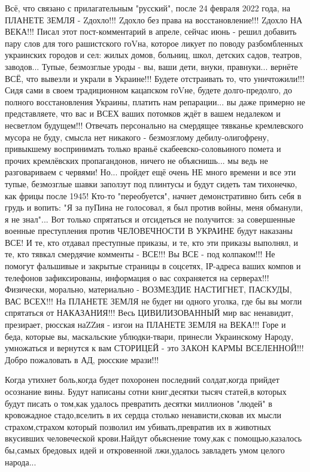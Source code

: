 Всё, что связано с прилагательным "русский", после 24 февраля 2022 года, на ПЛАНЕТЕ ЗЕМЛЯ - Zдохло!!! Zдохло без права на восстановление!!! Zдохло НА ВЕКА!!!
Писал этот пост-комментарий в апреле, сейчас июнь - решил добавить пару слов для того рашистского гоVна, которое ликует по поводу разбомбленных украинских городов и сел: жилых домов, больниц, школ, детских садов, театров, заводов...
Тупые, безмозглые уроды - вы, ваши дети, внуки, правнуки... вернёте ВСЁ, что вывезли и украли в Украине!!! Будете отстраивать то, что уничтожили!!! Сидя сами в своем традиционном кацапском гоVне, будете долго-предолго, до полного восстановления Украины, платить нам репарации... вы даже примерно не представляете, что вас и ВСЕХ ваших потомков ждёт в вашем недалеком и несветлом будущем!!!
Отвечать персонально на смердящее тявканье кремлевского мусора не буду, смысла нет никакого - безмозглому дебилу-олигофрену, привыкшему воспринимать только враньё скабеевско-соловьиного помета и прочих кремлёвских пропагандонов, ничего не объяснишь... мы ведь не разговариваем с червями!
Но... пройдет ещё очень НЕ много времени и все эти тупые, безмозглые шавки заползут под плинтусы и будут сидеть там тихонечко, как фрицы после 1945! Кто-то "переобуется", начнет демонстративно бить себя в грудь и вопить: "Я за пуПина не голосовал, я был против войны, меня обманули, я не знал"...
Вот только спрятаться и отсидеться не получится: за совершенные военные преступления против ЧЕЛОВЕЧНОСТИ В УКРАИНЕ будут наказаны ВСЕ! И те, кто отдавал преступные приказы, и те, кто эти приказы выполнял, и те, кто тявкал смердячие комменты - ВСЕ!!! Вы ВСЕ - под колпаком!!! Не помогут фальшивые и закрытые страницы в соцсетях, ІР-адреса ваших компов и телефонов зафиксированы, информация о вас сохраняется на серверах!!!
Физически, морально, материально - ВОЗМЕЗДИЕ НАСТИГНЕТ, ПАСКУДЫ, ВАС ВСЕХ!!!
На ПЛАНЕТЕ ЗЕМЛЯ не будет ни одного уголка, где бы вы могли спрятаться от НАКАЗАНИЯ!!! Весь ЦИВИЛИЗОВАННЫЙ мир вас ненавидит, презирает, рюсская наZZия - изгои на ПЛАНЕТЕ ЗЕМЛЯ на ВЕКА!!!
Горе и беда, которые вы, маскальские ублюдки-твари, принесли Украинскому Народу, умножаться и вернутся к вам СТОРИЦЕЙ - это ЗАКОН КАРМЫ ВСЕЛЕННОЙ!!!
Добро пожаловать в АД, рюсские мрази!!!

Когда утихнет боль,когда будет похоронен последний солдат,когда прийдет
осознание вины. Будут написаны сотни книг,десятки тысяч статей,в которых будут
писать о том,как удалось превратить десятки миллионов "людей" в кровожадное
стадо,вселить в их сердца столько ненависти,сковав их мысли страхом,страхом
который позволил им убивать,превратив их в животных вкусивших человеческой
крови.Найдут обьяснение тому,как с помощью,казалось бы,самых бредовых идей и
откровенной лжи,удалось завладеть умом целого народа...

